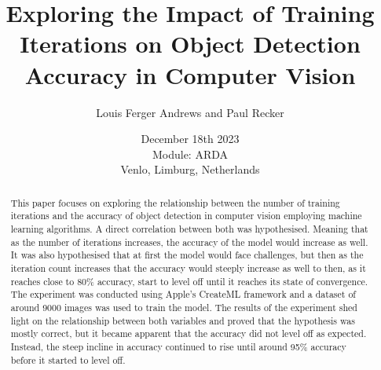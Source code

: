 \documentclass[]{report}
\title{Exploring the Impact of Training Iterations on Object Detection Accuracy in Computer Vision}
\author{Louis Ferger Andrews and Paul Recker}
\date{December 18th 2023 \\Module: ARDA \\Venlo, Limburg, Netherlands}
\begin{document}
\maketitle

\begin{abstract}
This paper focuses on exploring the relationship between the number of training iterations and the accuracy of object detection
in computer vision employing machine learning algorithms. A direct correlation between both was hypothesised. Meaning that as the number
of iterations increases, the accuracy of the model would increase as well. It was also hypothesised that at first the model would face
challenges, but then as the iteration count increases that the accuracy would steeply increase as well to then,
as it reaches close to 80\% accuracy, start to level off until it reaches its state of convergence. 
The experiment was conducted using Apple's CreateML framework and a dataset of around 9000 images was used to train the model.
The results of the experiment shed light on the relationship between both variables and proved that the hypothesis was mostly correct, 
but it became apparent that the accuracy did not level off as expected. Instead, the steep incline in accuracy continued to rise until
around 95\% accuracy before it started to level off. 

\end{abstract}

\tableofcontents
\setcounter{page}{3}
\listoffigures %
\listoftables %
\pagebreak
{}	
	
 




\printbibliography[title=References]

\clearpage
\appendix

\end{document}
